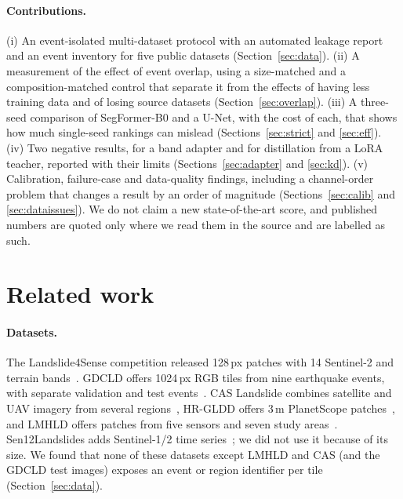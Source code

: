 \documentclass[11pt]{article}
\begin{document}
\paragraph{Contributions.} (i) An event-isolated multi-dataset protocol with an automated leakage report and an event inventory for five public datasets (Section~\ref{sec:data}). (ii) A measurement of the effect of event overlap, using a size-matched and a composition-matched control that separate it from the effects of having less training data and of losing source datasets (Section~\ref{sec:overlap}). (iii) A three-seed comparison of SegFormer-B0 and a U-Net, with the cost of each, that shows how much single-seed rankings can mislead (Sections~\ref{sec:strict} and \ref{sec:eff}). (iv) Two negative results, for a band adapter and for distillation from a LoRA teacher, reported with their limits (Sections~\ref{sec:adapter} and \ref{sec:kd}). (v) Calibration, failure-case and data-quality findings, including a channel-order problem that changes a result by an order of magnitude (Sections~\ref{sec:calib} and \ref{sec:dataissues}). We do not claim a new state-of-the-art score, and published numbers are quoted only where we read them in the source and are labelled as such.

\section{Related work}
\paragraph{Datasets.} The Landslide4Sense competition released 128\,px patches with 14 Sentinel-2 and terrain bands~\cite{ghorbanzadeh2022}. GDCLD offers 1024\,px RGB tiles from nine earthquake events, with separate validation and test events~\cite{fang2024gdcld}. CAS Landslide combines satellite and UAV imagery from several regions~\cite{xu2024cas}, HR-GLDD offers 3\,m PlanetScope patches~\cite{meena2023hrgldd}, and LMHLD offers patches from five sensors and seven study areas~\cite{liu2025lmhld}. Sen12Landslides adds Sentinel-1/2 time series~\cite{hohn2025sen12}; we did not use it because of its size. We found that none of these datasets except LMHLD and CAS (and the GDCLD test images) exposes an event or region identifier per tile (Section~\ref{sec:data}).
\end{document}
